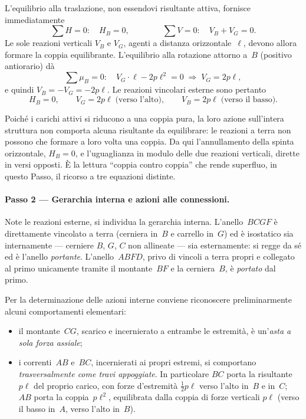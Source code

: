 L'equilibrio alla traslazione, non essendovi risultante
attiva, fornisce immediatamente
\[
\sum H = 0:\quad H_B = 0,
\qquad\qquad
\sum V = 0:\quad V_B + V_G = 0 .
\]
Le sole reazioni verticali $V_B$ e $V_G$, agenti a distanza
orizzontale~$\ell$, devono allora formare la coppia
equilibrante. L'equilibrio alla rotazione attorno a~$B$
(positivo antiorario) dà
\[
\sum \mu_B = 0:\quad
V_G\cdot\ell - 2p\ell^2 = 0
\;\Rightarrow\;
V_G = 2p\ell,
\]
e quindi $V_B = -V_G = -2p\ell$. Le reazioni vincolari
esterne sono pertanto
\[
H_B = 0,
\qquad
V_G = 2p\ell \;\text{(verso l'alto)},
\qquad
V_B = 2p\ell \;\text{(verso il basso)}.
\]

\begin{oss}
	Poiché i carichi attivi si riducono a una coppia pura,
	la loro azione sull'intera struttura non comporta alcuna
	risultante da equilibrare: le reazioni a terra non
	possono che formare a loro volta una coppia. Da qui
	l'annullamento della spinta orizzontale, $H_B = 0$,
	e l'uguaglianza in modulo delle due reazioni verticali,
	dirette in versi opposti. È la lettura ``coppia contro
	coppia'' che rende superfluo, in questo Passo, il
	ricorso a tre equazioni distinte.
\end{oss}

\paragraph{Passo 2 --- Gerarchia interna e azioni
	alle connessioni.}

Note le reazioni esterne, si individua la gerarchia
interna. L'anello~$BCGF$ è direttamente vincolato a
terra (cerniera in~$B$ e carrello in~$G$) ed è isostatico
sia internamente --- cerniere $B$, $G$, $C$ non allineate
--- sia esternamente: si regge da sé ed è l'anello
\emph{portante}. L'anello~$ABFD$, privo di vincoli a
terra propri e collegato al primo unicamente tramite il
montante~$BF$ e la cerniera~$B$, è \emph{portato} dal
primo.

Per la determinazione delle azioni interne conviene
riconoscere preliminarmente alcuni comportamenti
elementari:
\begin{itemize}[noitemsep]
	\item il montante~$CG$, scarico e incernierato a
	entrambe le estremità, è un'\emph{asta a sola forza
		assiale};
	\item i correnti~$AB$ e~$BC$, incernierati ai propri
	estremi, si comportano \emph{trasversalmente come travi
		appoggiate}. In particolare $BC$ porta la risultante
	$p\ell$ del proprio carico, con forze d'estremità
	$\tfrac12 p\ell$ verso l'alto in~$B$ e in~$C$; $AB$
	porta la coppia~$p\ell^2$, equilibrata dalla coppia di
	forze verticali $p\ell$ (verso il basso in~$A$, verso
	l'alto in~$B$).
\end{itemize}

